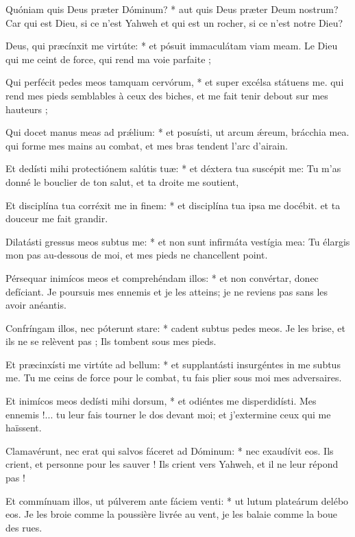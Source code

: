 \begin{paracol}{2}

\LigneParacol
{Quóniam quis Deus præter Dóminum? * aut quis Deus præter Deum nostrum?}
{Car qui est Dieu, si ce n'est Yahweh et qui est un rocher, si ce n'est notre Dieu? }

\LigneParacol
{Deus, qui præcínxit me virtúte: * et pósuit immaculátam viam meam.}
{Le Dieu qui me ceint de force, qui rend ma voie parfaite ; }

\LigneParacol
{Qui perfécit pedes meos tamquam cervórum, * et super excélsa státuens me.}
{qui rend mes pieds semblables à ceux des biches, et me fait tenir debout sur mes hauteurs ; }

\LigneParacol
{Qui docet manus meas ad prǽlium: * et posuísti, ut arcum ǽreum, brácchia mea.}
{qui forme mes mains au combat, et mes bras tendent l'arc d'airain. }

\LigneParacol
{Et dedísti mihi protectiónem salútis tuæ: * et déxtera tua suscépit me:}
{Tu m'as donné le bouclier de ton salut, et ta droite me soutient,}

\LigneParacol
{Et disciplína tua corréxit me in finem: * et disciplína tua ipsa me docébit.}
{et ta douceur me fait grandir. }

\LigneParacol
{Dilatásti gressus meos subtus me: * et non sunt infirmáta vestígia mea:}
{Tu élargis mon pas au-dessous de moi, et mes pieds ne chancellent point. }

\LigneParacol
{Pérsequar inimícos meos et comprehéndam illos: * et non convértar, donec defíciant.}
{Je poursuis mes ennemis et je les atteins; je ne reviens pas sans les avoir anéantis. }

\LigneParacol
{Confríngam illos, nec póterunt stare: * cadent subtus pedes meos.}
{Je les brise, et ils ne se relèvent pas ; Ils tombent sous mes pieds. }

\LigneParacol
{Et præcinxísti me virtúte ad bellum: * et supplantásti insurgéntes in me subtus me.}
{Tu me ceins de force pour le combat, tu fais plier sous moi mes adversaires. }

\LigneParacol
{Et inimícos meos dedísti mihi dorsum, * et odiéntes me disperdidísti.}
{Mes ennemis !... tu leur fais tourner le dos devant moi; et j'extermine ceux qui me haïssent. }

\LigneParacol
{Clamavérunt, nec erat qui salvos fáceret ad Dóminum: * nec exaudívit eos.}
{Ils crient, et personne pour les sauver ! Ils crient vers Yahweh, et il ne leur répond pas ! }

\LigneParacol
{Et commínuam illos, ut púlverem ante fáciem venti: * ut lutum plateárum delébo eos.}
{Je les broie comme la poussière livrée au vent, je les balaie comme la boue des rues. }


\end{paracol}
